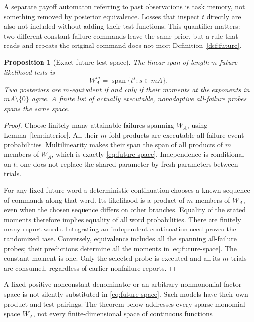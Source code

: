 \documentclass[11pt]{amsart}
\newtheorem{proposition}[theorem]{Proposition}
\theoremstyle{definition}\newtheorem{definition}[theorem]{Definition}
\theoremstyle{remark}\newtheorem{remark}[theorem]{Remark}
\DeclareMathOperator{\spanop}{span}\DeclareMathOperator{\rank}{rank}
\begin{document}
A separate payoff automaton referring to past observations is task memory,
not something removed by posterior equivalence. Losses that inspect $t$
directly are also not included without adding their test functions. This
quantifier matters: two different constant failure commands leave the
same prior, but a rule that reads and repeats the original command does
not meet Definition~\ref{def:future}.

\begin{proposition}[Exact future test space]\label{prop:tests}
The linear span of length-$m$ future likelihood tests is
\begin{equation}\label{eq:future-space}
 W_A^m=\spanop\{t^s:s\in mA\}.
\end{equation}
Two posteriors are $m$-equivalent if and only if their moments at the
exponents in $mA\setminus\{0\}$ agree. A finite list of actually
executable, nonadaptive all-failure probes spans the same space.
\end{proposition}
\begin{proof}
Choose finitely many attainable failures spanning $W_A$, using
Lemma~\ref{lem:interior}. All their $m$-fold products are executable
all-failure event probabilities. Multilinearity makes their span the
span of all products of $m$ members of $W_A$, which is exactly
\eqref{eq:future-space}. Independence is conditional on $t$; one does
not replace the shared parameter by fresh parameters between trials.

For any fixed future word a deterministic continuation chooses a known
sequence of commands along that word. Its likelihood is a product of
$m$ members of $W_A$, even when the chosen sequence differs on other
branches. Equality of the stated moments therefore implies equality of
all word probabilities. There are finitely many report words. Integrating
an independent continuation seed proves the randomized case. Conversely,
equivalence includes all the spanning all-failure probes; their predictions
determine all the moments in \eqref{eq:future-space}. The constant moment
is one. Only the selected probe is executed and all its $m$ trials are
consumed, regardless of earlier nonfailure reports.
\end{proof}

A fixed positive nonconstant denominator or an arbitrary nonmonomial
factor space is not silently substituted in \eqref{eq:future-space}.
Such models have their own product and test pairings. The theorem below
addresses every sparse monomial space $W_A$, not every finite-dimensional
space of continuous functions.
\end{document}
